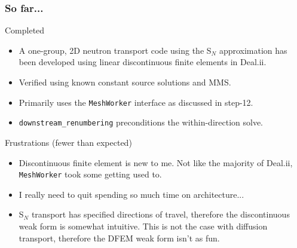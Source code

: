 \documentclass[xcolor={usenames,dvipsnames,svgnames,table}]{beamer}
\begin{document}

\begin{frame}\frametitle{So far...}
	\begin{block}{Completed}
		\begin{itemize}
			\item A one-group, 2D neutron transport code using the S$_N$ approximation has been developed using linear discontinuous finite elements in Deal.ii.
			\item Verified using known constant source solutions and MMS.
			\item Primarily uses the \texttt{MeshWorker} interface as discussed in step-12.
			\item \texttt{downstream\_renumbering} preconditions the within-direction solve.
		\end{itemize}
	\end{block}
	\begin{block}{Frustrations \tiny{(fewer than expected)}}
		\begin{itemize}
			\item Discontinuous finite element is new to me. Not like the majority of Deal.ii, \texttt{MeshWorker} took some getting used to.
			\item I really need to quit spending so much time on architecture...
			\item S$_N$ transport has specified directions of travel, therefore the discontinuous weak form is somewhat intuitive. This is not the case with diffusion transport, therefore the DFEM weak form isn't as fun.
		\end{itemize}
	\end{block}
\end{frame}

\end{document}
